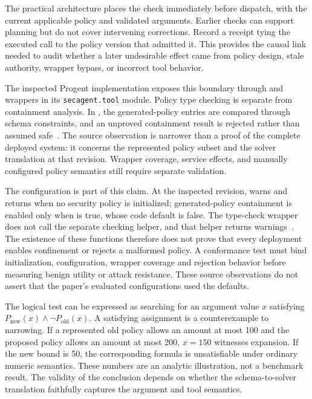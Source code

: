 The practical architecture places the check immediately before dispatch, with the current applicable policy and validated arguments. Earlier checks can support planning but do not cover intervening corrections. Record a receipt tying the executed call to the policy version that admitted it. This provides the causal link needed to audit whether a later undesirable effect came from policy design, stale authority, wrapper bypass, or incorrect tool behavior.

The inspected Progent implementation exposes this boundary through  and wrappers in its \texttt{secagent.tool} module. Policy type checking is separate from containment analysis. In , the generated-policy entries are compared through schema constraints, and an unproved containment result is rejected rather than assumed safe~\cite{repo_progent2026}. The source observation is narrower than a proof of the complete deployed system: it concerns the represented policy subset and the solver translation at that revision. Wrapper coverage, service effects, and manually configured policy semantics still require separate validation.

The configuration is part of this claim. At the inspected revision,  warns and returns when no security policy is initialized; generated-policy containment is enabled only when  is true, whose code default is false. The  type-check wrapper does not call the separate checking helper, and that helper returns warnings~\cite{repo_progent2026}. The existence of these functions therefore does not prove that every deployment enables confinement or rejects a malformed policy. A conformance test must bind initialization, configuration, wrapper coverage and rejection behavior before measuring benign utility or attack resistance. These source observations do not assert that the paper's evaluated configurations used the defaults.

The logical test can be expressed as searching for an argument value $x$ satisfying $P_{\mathrm{new}}(x)\land\neg P_{\mathrm{old}}(x)$. A satisfying assignment is a counterexample to narrowing. If a represented old policy allows an amount at most 100 and the proposed policy allows an amount at most 200, $x=150$ witnesses expansion. If the new bound is 50, the corresponding formula is unsatisfiable under ordinary numeric semantics. These numbers are an analytic illustration, not a benchmark result. The validity of the conclusion depends on whether the schema-to-solver translation faithfully captures the argument and tool semantics.

